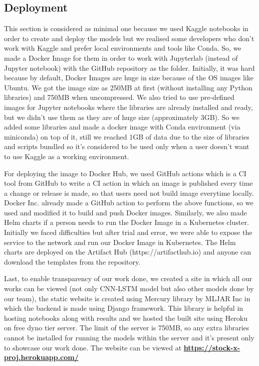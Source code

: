 \documentclass[conference]{IEEEtran}
\begin{document}
\subsection{Deployment}
This section is considered as minimal one because we used Kaggle notebooks in order to create and deploy the models but we realised some developers who don't work with Kaggle and prefer local environments and tools like Conda. So, we made a Docker Image for them in order to work with Jupyterlab (instead of Jupyter notebook) with the GitHub repository as the folder. Initially, it was hard because by default, Docker Images are huge in size because of the OS images like Ubuntu. We got the image size as 250MB at first (without installing any Python libraries) and 750MB when uncompressed. We also tried to use pre-defined images for Jupyter notebooks where the libraries are already installed and ready, but we didn't use them as they are of huge size (approximately 3GB). So we added some libraries and made a docker image with Conda environment (via miniconda) on top of it, still we reached 1GB of data due to the size of libraries and scripts bundled so it's considered to be used only when a user doesn't want to use Kaggle as a working environment.

For deploying the image to Docker Hub, we used GitHub actions which is a CI tool from GitHub to write a CI action in which an image is published every time a change or release is made, so that users need not build image everytime locally. Docker Inc. already made a GitHub action \cite{b13} to perform the above functions, so we used and modified it to build and push Docker images. Similarly, we also made Helm charts if a person needs to run the Docker Image in a Kubernetes cluster. Initially we faced difficulties but after trial and error, we were able to expose the service to the network and run our Docker Image in Kubernetes. The Helm charts are deployed on the Artifact Hub (https://artifacthub.io) and anyone can download the templates from the repository.

Last, to enable transparency of our work done, we created a site in which all our works can be viewed (not only CNN-LSTM model but also other models done by our team), the static website is created using Mercury library \cite{b24} by MLJAR Inc in which the backend is made using Django framework. This library is helpful in hosting notebooks along with results and we hosted the built site using Heroku on free dyno tier server. The limit of the server is 750MB, so any extra libraries cannot be installed for running the models within the server and it's present only to showcase our work done. The website can be viewed at \textbf{ \href{https://stock-x-proj.herokuapp.com/}{https://stock-x-proj.herokuapp.com/}}
\end{document}
